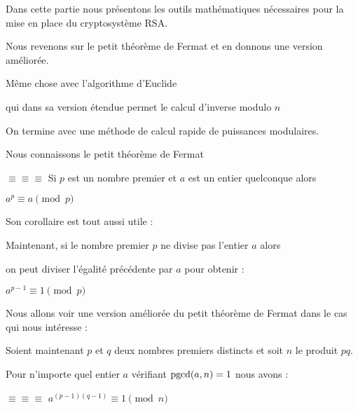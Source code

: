 







\debuttexte


\diapo

\change

Dans cette partie nous présentons les outils mathématiques
nécessaires pour la mise en place du cryptosystème RSA.

\change

Nous revenons sur le petit théorème de Fermat et en donnons une version 
améliorée.

\change

Même chose avec l'algorithme d'Euclide

\change
qui dans sa version étendue permet le calcul d'inverse modulo $n$

\change
On termine avec une méthode de calcul rapide de puissances modulaires.


\diapo

Nous connaissons le petit théorème de Fermat 


$\equiv \equiv \equiv$
Si $p$ est un nombre premier et $a$ est un entier quelconque alors

$a^p \equiv a \pmod p$

\change

Son corollaire est tout aussi utile :

Maintenant, si le nombre premier $p$ ne divise pas l'entier $a$ alors

on peut diviser l'égalité précédente par $a$ pour obtenir :

$a^{p-1} \equiv 1 \pmod p$


\diapo

Nous allons voir une version améliorée du petit théorème de Fermat 
dans le cas qui nous intéresse :


Soient maintenant $p$ et $q$ deux nombres premiers distincts et soit $n$ le produit $p q$. 

Pour n'importe quel entier $a$ vérifiant $\mathop{\mathrm{pgcd}}\nolimits(a,n)=1$ nous avons :

$\equiv \equiv \equiv$
$a^{(p-1)(q-1)} \equiv 1 \pmod n$

